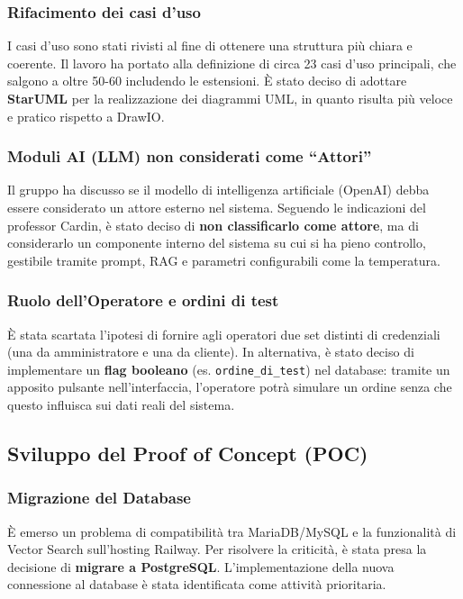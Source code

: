 \documentclass[a4paper, 11pt, oneside]{scrartcl}
\begin{document}
\subsubsection{Rifacimento dei casi d'uso}
I casi d'uso sono stati rivisti al fine di ottenere una struttura più chiara e coerente. Il lavoro ha portato alla definizione di circa 23 casi d'uso principali, che salgono a oltre 50-60 includendo le estensioni. È stato deciso di adottare \textbf{StarUML} per la realizzazione dei diagrammi UML, in quanto risulta più veloce e pratico rispetto a DrawIO.

\subsubsection{Moduli AI (LLM) non considerati come ``Attori''}
Il gruppo ha discusso se il modello di intelligenza artificiale (OpenAI) debba essere considerato un attore esterno nel sistema. Seguendo le indicazioni del professor Cardin, è stato deciso di \textbf{non classificarlo come attore}, ma di considerarlo un componente interno del sistema su cui si ha pieno controllo, gestibile tramite prompt, RAG e parametri configurabili come la temperatura.

\subsubsection{Ruolo dell'Operatore e ordini di test}
È stata scartata l'ipotesi di fornire agli operatori due set distinti di credenziali (una da amministratore e una da cliente). In alternativa, è stato deciso di implementare un \textbf{flag booleano} (es. \texttt{ordine\_di\_test}) nel database: tramite un apposito pulsante nell'interfaccia, l'operatore potrà simulare un ordine senza che questo influisca sui dati reali del sistema.

\subsection{Sviluppo del Proof of Concept (POC)}

\subsubsection{Migrazione del Database}
È emerso un problema di compatibilità tra MariaDB/MySQL e la funzionalità di Vector Search sull'hosting Railway. Per risolvere la criticità, è stata presa la decisione di \textbf{migrare a PostgreSQL}. L'implementazione della nuova connessione al database è stata identificata come attività prioritaria.
\end{document}
